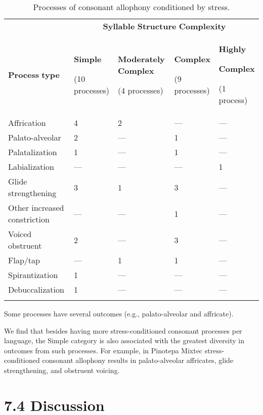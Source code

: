 \begin{table}
\begin{tabularx}{\textwidth}{XXXXX}
\lsptoprule
 & \multicolumn{4}{c}{ \textbf{Syllable} \textbf{Structure} \textbf{Complexity}}\\
 \textbf{Process} \textbf{type} & { \textbf{Simple}}

 (10 processes) & { \textbf{Moderately} \textbf{Complex}}

 (4 processes) & { \textbf{Complex}}

 (9 processes) & { \textbf{Highly} }

{ \textbf{Complex}}

 (1 process)\\
 Affrication & 4 & 2 & — & —\\
 Palato-alveolar & 2 & — & 1 & —\\
 Palatalization & 1 & — & 1 & —\\
 Labialization & — & — & — & 1\\
 Glide strengthening & 3 & 1 & 3 & —\\
 Other increased constriction & — & — & 1 & —\\
 Voiced obstruent & 2 & — & 3 & —\\
 Flap/tap & — & 1 & 1 & —\\
 Spirantization & 1 & — & — & —\\
 Debuccalization & 1 & — & — & —\\
\lspbottomrule
\end{tabularx}
\caption{\label{7.9}Processes of consonant allophony conditioned by stress.}Some processes have several outcomes (e.g., palato-alveolar and affricate).
\end{table}




  We find that besides having more stress-conditioned consonant processes per language, the Simple category is also associated with the greatest diversity in outcomes from such processes. For example, in Pinotepa Mixtec stress-conditioned consonant allophony results in palato-alveolar affricates, glide strengthening, and obstruent voicing.


\section{7.4 Discussion}

